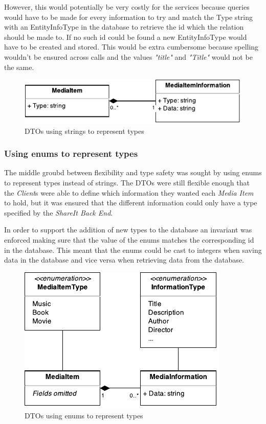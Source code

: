 \documentclass[../report.tex]{subfiles}
\begin{document}
However, this would potentially be very costly for the services because queries would have to be made for every information to try and match the Type string with an EntityInfoType in the database to retrieve the id which the relation should be made to. If no such id could be found a new EntityInfoType would have to be created and stored. This would be extra cumbersome because spelling wouldn't be ensured across calls and the values \textit{"title"} and \textit{"Title"} would not be the same.
 
\begin{figure}[!h]
\label{fig:dto_types_string}
\centering
\includegraphics[scale=0.7]{../img/typesAsString.pdf}
\caption{DTOs using strings to represent types}
\end{figure}

\subsubsection{Using enums to represent types}
The middle groubd between flexibility and type safety was sought by using enums to represent types instead of strings.
The DTOs were still flexible enough that the \textit{Client}s were able to define which information they wanted each \textit{Media Item} to hold, but it was ensured that the different information could only have a type specified by the \textit{ShareIt Back End}.

In order to support the addition of new types to the database an invariant was enforced making sure that the value of the enums matches the corresponding id in the database. 
This meant that the enums could be cast to integers when saving data in the database and vice versa when retrieving data from the database. 

\begin{figure}[!h]
\label{fig:dto_types_enum}
\centering
\includegraphics[scale=0.7]{../img/typesAsEnum.pdf}
\caption{DTOs using enums to represent types}
\end{figure}
\end{document}
